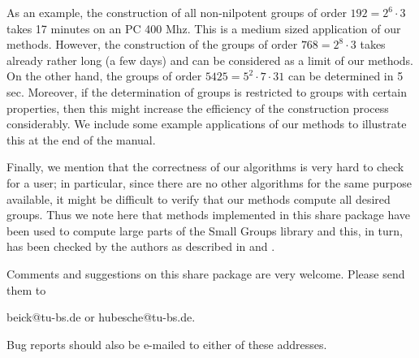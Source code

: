 As an example, the construction of all non-nilpotent groups of order 
$192 = 2^6 \cdot 3$ takes 17 minutes on an PC 400 Mhz. This is a medium 
sized application of our methods.  However, the construction of the groups
of order $768 = 2^8 \cdot 3$ takes already rather long (a few days) and 
can be considered as a limit of our methods. On the other hand, the 
groups of order $5425 = 5^2 \cdot 7 \cdot 31$ can be determined in 5 sec.
Moreover, if the determination of groups is restricted to groups
with certain properties, then this might increase the efficiency
of the construction process considerably. We include some example
applications of our methods to illustrate this at the end of the
manual.

Finally, we mention that the correctness of our algorithms is very
hard to check for a user; in particular, since there are no other
algorithms for the same purpose available, it might be difficult to
verify that our methods compute all desired groups. Thus we note here 
that methods implemented in this share package have been used to compute 
large parts of the Small Groups library and this, in turn, has been 
checked by the authors as described in \cite{BE99} and \cite{BE1000}.

Comments and suggestions on this share package are very welcome.
Please send them to 

\centerline{ beick@tu-bs.de or hubesche@tu-bs.de.}

Bug reports should also be e-mailed to either of these addresses.

